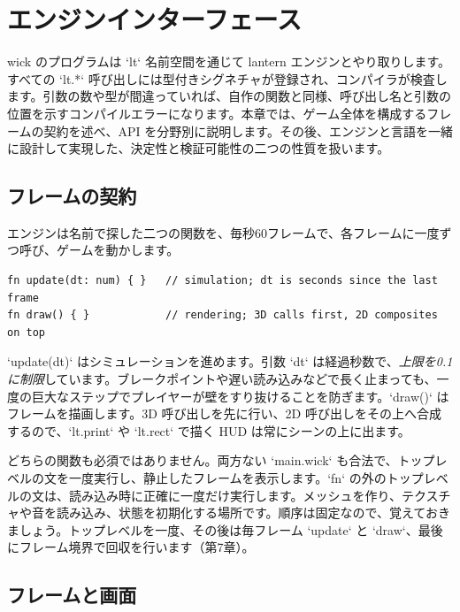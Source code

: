 \chapter{エンジンインターフェース}

wick のプログラムは `lt` 名前空間を通じて lantern エンジンとやり取りします。すべての `lt.*` 呼び出しには型付きシグネチャが登録され、コンパイラが検査します。引数の数や型が間違っていれば、自作の関数と同様、呼び出し名と引数の位置を示すコンパイルエラーになります。本章では、ゲーム全体を構成するフレームの契約を述べ、API を分野別に説明します。その後、エンジンと言語を一緒に設計して実現した、決定性と検証可能性の二つの性質を扱います。

\section{フレームの契約}

エンジンは名前で探した二つの関数を、毎秒60フレームで、各フレームに一度ずつ呼び、ゲームを動かします。

\begin{lstlisting}[language=wick]
fn update(dt: num) { }   // simulation; dt is seconds since the last frame
fn draw() { }            // rendering; 3D calls first, 2D composites on top
\end{lstlisting}

\noindent
`update(dt)` はシミュレーションを進めます。引数 `dt` は経過秒数で、\emph{上限を0.1に制限}しています。ブレークポイントや遅い読み込みなどで長く止まっても、一度の巨大なステップでプレイヤーが壁をすり抜けることを防ぎます。`draw()` はフレームを描画します。3D 呼び出しを先に行い、2D 呼び出しをその上へ合成するので、`lt.print` や `lt.rect` で描く HUD は常にシーンの上に出ます。

どちらの関数も必須ではありません。両方ない `main.wick` も合法で、トップレベルの文を一度実行し、静止したフレームを表示します。`fn` の外のトップレベルの文は、読み込み時に正確に一度だけ実行します。メッシュを作り、テクスチャや音を読み込み、状態を初期化する場所です。順序は固定なので、覚えておきましょう。トップレベルを一度、その後は毎フレーム `update` と `draw`、最後にフレーム境界で回収を行います（第7章）。

\section{フレームと画面}

